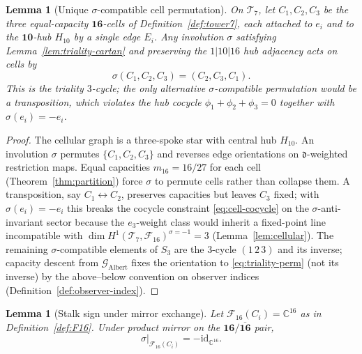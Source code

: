 \documentclass[aps,prd,onecolumn,amsmath,amssymb,nofootinbib,11pt]{revtex4-2}
\numberwithin{equation}{section}
\theoremstyle{plain}
\newtheorem{lemma}[theorem]{Lemma}
\theoremstyle{definition}
\theoremstyle{remark}
\newcommand{\C}{\mathbb{C}}
\begin{document}
\begin{lemma}[Unique $\sigma$-compatible cell permutation]\label{lem:triality-perm}
On $\mathcal{T}_7$, let $C_1,C_2,C_3$ be the three equal-capacity
$\mathbf{16}$-cells of Definition~\ref{def:tower7}, each attached to $e_i$ and
to the $\mathbf{10}$-hub $H_{10}$ by a single edge $E_i$. Any involution
$\sigma$ satisfying Lemma~\ref{lem:triality-cartan} and preserving the
$1|10|16$ hub adjacency acts on cells by
\begin{equation}\label{eq:triality-perm}
  \sigma(C_1,C_2,C_3)=(C_2,C_3,C_1).
\end{equation}
This is the triality $3$-cycle; the only alternative $\sigma$-compatible
permutation would be a transposition, which violates the hub cocycle
$\phi_1+\phi_2+\phi_3=0$ together with $\sigma(e_i)=-e_i$.
\end{lemma}

\begin{proof}
The cellular graph is a three-spoke star with central hub $H_{10}$. An
involution $\sigma$ permutes $\{C_1,C_2,C_3\}$ and reverses edge orientations
on $\mathfrak{d}$-weighted restriction maps. Equal capacities
$m_{16}=16/27$ for each cell (Theorem~\ref{thm:partition}) force $\sigma$ to
permute cells rather than collapse them. A transposition, say
$C_1\leftrightarrow C_2$, preserves capacities but leaves $C_3$ fixed; with
$\sigma(e_i)=-e_i$ this breaks the cocycle constraint
\eqref{eq:cell-cocycle} on the $\sigma$-anti-invariant sector because the
$e_3$-weight class would inherit a fixed-point line incompatible with
$\dim H^1(\mathcal{T}_7,\mathcal{F}_{16})^{\sigma=-1}=3$
(Lemma~\ref{lem:cellular}). The remaining $\sigma$-compatible elements of
$S_3$ are the $3$-cycle $(1\,2\,3)$ and its inverse; capacity descent from
$\mathcal{G}_{\mathrm{Albert}}$ fixes the orientation to
\eqref{eq:triality-perm} (not its inverse) by the above--below convention on
observer indices (Definition~\ref{def:observer-index}).
\end{proof}

\begin{lemma}[Stalk sign under mirror exchange]\label{lem:triality-sign}
Let $\mathcal{F}_{16}(C_i)=\C^{16}$ as in Definition~\ref{def:F16}. Under
product mirror on the $\mathbf{16}/\overline{\mathbf{16}}$ pair,
\begin{equation}\label{eq:triality-sign}
  \sigma|_{\mathcal{F}_{16}(C_i)}=-\mathrm{id}_{\C^{16}}.
\end{equation}
\end{lemma}
\end{document}
